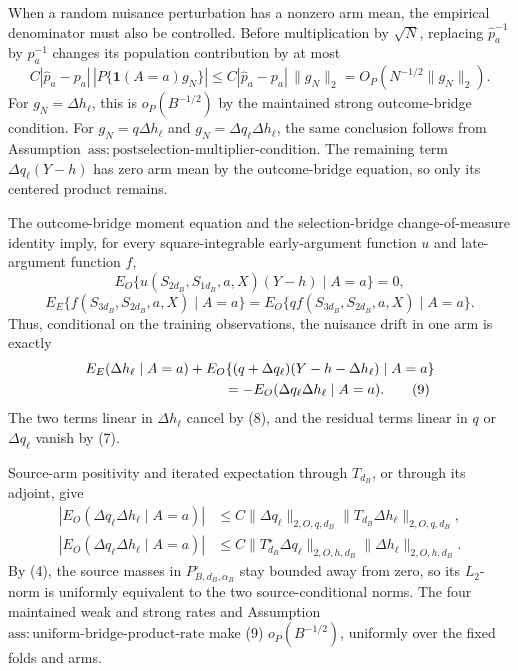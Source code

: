When a random nuisance perturbation has a nonzero arm mean, the empirical denominator must also be controlled.  Before multiplication by \(\sqrt N\), replacing \(\widehat p_a^{-1}\) by \(p_a^{-1}\) changes its population contribution by at most
\[
 C|\widehat p_a-p_a|\,|P\{\mathbf1(A=a)g_N\}|
 \le C|\widehat p_a-p_a|\,\|g_N\|_2
 =O_P(N^{-1/2}\|g_N\|_2).                                   \tag{6}
\]
For \(g_N=\Delta h_\ell\), this is \(o_P(B^{-1/2})\) by the maintained strong outcome-bridge condition.  For \(g_N=q\Delta h_\ell\) and \(g_N=\Delta q_\ell\Delta h_\ell\), the same conclusion follows from Assumption~\(\mathrm{ass{:}postselection\text{-}multiplier\text{-}condition}\).  The remaining term \(\Delta q_\ell(Y-h)\) has zero arm mean by the outcome-bridge equation, so only its centered product remains.

The outcome-bridge moment equation and the selection-bridge change-of-measure identity imply, for every square-integrable early-argument function \(u\) and late-argument function \(f\),
\[
 E_O\{u(S_{2d_B},S_{1d_B},a,X)(Y-h)\mid A=a\}=0,              \tag{7}
\]
\[
 E_E\{f(S_{3d_B},S_{2d_B},a,X)\mid A=a\}
 =E_O\{qf(S_{3d_B},S_{2d_B},a,X)\mid A=a\}.                 \tag{8}
\]
Thus, conditional on the training observations, the nuisance drift in one arm is exactly
\[
\begin{aligned}
 &E_E(\Delta h_\ell\mid A=a)
 +E_O\{(q+\Delta q_\ell)(Y-h-\Delta h_\ell)\mid A=a\}\\
 &\hspace{35mm}=-E_O(\Delta q_\ell\Delta h_\ell\mid A=a).   \tag{9}
\end{aligned}
\]
The two terms linear in \(\Delta h_\ell\) cancel by (8), and the residual terms linear in \(q\) or \(\Delta q_\ell\) vanish by (7).

Source-arm positivity and iterated expectation through \(T_{d_B}\), or through its adjoint, give
\[
\begin{aligned}
 |E_O(\Delta q_\ell\Delta h_\ell\mid A=a)|
 &\le C\|\Delta q_\ell\|_{2,O,q,d_B}
       \|T_{d_B}\Delta h_\ell\|_{2,O,q,d_B},\\
 |E_O(\Delta q_\ell\Delta h_\ell\mid A=a)|
 &\le C\|T_{d_B}^{\star}\Delta q_\ell\|_{2,O,h,d_B}
       \|\Delta h_\ell\|_{2,O,h,d_B}.                       \tag{10}
\end{aligned}
\]
By (4), the source masses in \(P_{B,d_B,\alpha_B}^{\circ}\) stay bounded away from zero, so its \(L_2\)-norm is uniformly equivalent to the two source-conditional norms.  The four maintained weak and strong rates and Assumption~\(\mathrm{ass{:}uniform\text{-}bridge\text{-}product\text{-}rate}\) make (9) \(o_P(B^{-1/2})\), uniformly over the fixed folds and arms.

